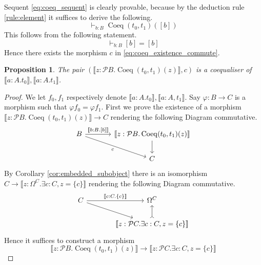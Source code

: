\documentclass{birkjour}
\theoremstyle{plain}
\newtheorem{proposition}[thm]{Proposition}
\theoremstyle{definition}
\newcommand{\call}[1]{\mathcal{#1}}
\newcommand{\lto}{\longrightarrow}
\begin{document}
	Sequent \eqref{eq:coeq_sequent} is clearly provable, because by the deduction rule \eqref{rule:element} it suffices to derive the following.
	\begin{equation}
		\vdash_{b:B}\operatorname{Coeq}(t_0,t_1)([b])
	\end{equation}
	This follows from the following statement.
	\begin{equation}
		\vdash_{b:B}[b] = [b]
	\end{equation}
	Hence there exists the morphism $c$ in \eqref{eq:coeq_existence_commute}.
	\begin{proposition}
		The pair $(\llbracket z: \call{P}B. \operatorname{Coeq}(t_0,t_1)(z)\rrbracket,c)$ is a coequaliser of $\llbracket a:A. t_0\rrbracket, \llbracket a:A. t_1\rrbracket$.
	\end{proposition}
	\begin{proof}
		We let $f_0,f_1$ respectively denote $\llbracket a:A. t_0\rrbracket, \llbracket a:A, t_1\rrbracket$. Say $\varphi: B \lto C$ is a morphism such that $\varphi f_0 = \varphi f_1$. First we prove the existence of a morphism $\llbracket z: \call{P}B. \operatorname{Coeq}(t_0,t_1)(z)\rrbracket \lto C$ rendering the following Diagram commutative.
		\begin{equation}
			\begin{tikzcd}[column sep = large]
				B\arrow[dr,swap,"c"]\arrow[r,"{\llbracket b:B. [b]\rrbracket}"] & \llbracket z: \call{P}B. \operatorname{Coeq}(t_0,t_1)(z)\rrbracket\arrow[d]\\
				& C
			\end{tikzcd}
		\end{equation}
		By Corollary \ref{cor:embedded_subobject} there is an isomorphism $C \lto \llbracket z: \Omega^C . \exists c:C, z = \lbrace c \rbrace \rrbracket$ rendering the following Diagram commutative.
		\begin{equation}
			\begin{tikzcd}[column sep = large]
				C\arrow[r,"{\llbracket c:C. \lbrace c \rbrace \rrbracket}"]\arrow[dr] & \Omega^C\\
				& \llbracket z: \call{P}C . \exists c:C, z = \lbrace c \rbrace \rrbracket\arrow[u,rightarrowtail]
			\end{tikzcd}
		\end{equation}
		Hence it suffices to construct a morphism
		\begin{equation}
			\llbracket z: \call{P}B . \operatorname{Coeq}(t_0,t_1)(z)\rrbracket \lto \llbracket z: \call{P}C. \exists c: C, z = \lbrace c \rbrace \rrbracket

\end{equation}
\end{proof}
\end{document}
